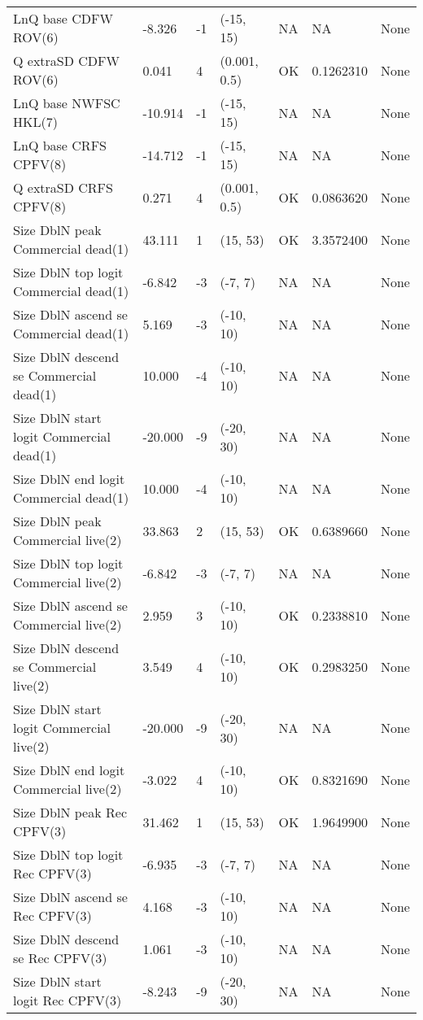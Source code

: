 \documentclass[11pt,
  english,
  letterpaper,
]{article}
\begin{document}
\begin{landscape}
\begin{longtable}[t]{>{\raggedright\arraybackslash}p{7cm}lllll>{\raggedright\arraybackslash}p{4cm}}
LnQ base CDFW ROV(6) & -8.326 & -1 & (-15, 15) & NA & NA & None\\
Q extraSD CDFW ROV(6) & 0.041 & 4 & (0.001, 0.5) & OK & 0.1262310 & None\\
LnQ base NWFSC HKL(7) & -10.914 & -1 & (-15, 15) & NA & NA & None\\
LnQ base CRFS CPFV(8) & -14.712 & -1 & (-15, 15) & NA & NA & None\\
Q extraSD CRFS CPFV(8) & 0.271 & 4 & (0.001, 0.5) & OK & 0.0863620 & None\\
Size DblN peak Commercial dead(1) & 43.111 & 1 & (15, 53) & OK & 3.3572400 & None\\
Size DblN top logit Commercial dead(1) & -6.842 & -3 & (-7, 7) & NA & NA & None\\
Size DblN ascend se Commercial dead(1) & 5.169 & -3 & (-10, 10) & NA & NA & None\\
Size DblN descend se Commercial dead(1) & 10.000 & -4 & (-10, 10) & NA & NA & None\\
Size DblN start logit Commercial dead(1) & -20.000 & -9 & (-20, 30) & NA & NA & None\\
Size DblN end logit Commercial dead(1) & 10.000 & -4 & (-10, 10) & NA & NA & None\\
Size DblN peak Commercial live(2) & 33.863 & 2 & (15, 53) & OK & 0.6389660 & None\\
Size DblN top logit Commercial live(2) & -6.842 & -3 & (-7, 7) & NA & NA & None\\
Size DblN ascend se Commercial live(2) & 2.959 & 3 & (-10, 10) & OK & 0.2338810 & None\\
Size DblN descend se Commercial live(2) & 3.549 & 4 & (-10, 10) & OK & 0.2983250 & None\\
Size DblN start logit Commercial live(2) & -20.000 & -9 & (-20, 30) & NA & NA & None\\
Size DblN end logit Commercial live(2) & -3.022 & 4 & (-10, 10) & OK & 0.8321690 & None\\
Size DblN peak Rec CPFV(3) & 31.462 & 1 & (15, 53) & OK & 1.9649900 & None\\
Size DblN top logit Rec CPFV(3) & -6.935 & -3 & (-7, 7) & NA & NA & None\\
Size DblN ascend se Rec CPFV(3) & 4.168 & -3 & (-10, 10) & NA & NA & None\\
Size DblN descend se Rec CPFV(3) & 1.061 & -3 & (-10, 10) & NA & NA & None\\
Size DblN start logit Rec CPFV(3) & -8.243 & -9 & (-20, 30) & NA & NA & None\\

\end{longtable}
\end{landscape}
\end{document}
